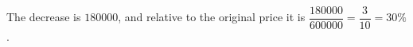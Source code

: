 The decrease is $ 180000 $, and relative to the original price it is $\dfrac{180000}{600000}=\dfrac{3}{10}=\boxed{30\%}$.
